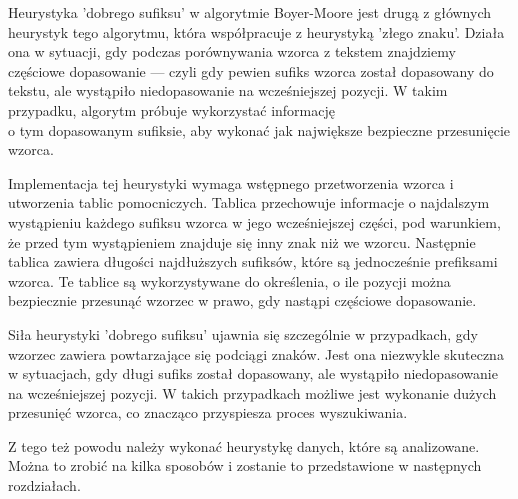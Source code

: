 Heurystyka 'dobrego sufiksu' w algorytmie Boyer-Moore 
jest drugą z głównych heurystyk tego algorytmu, która współpracuje z heurystyką 
'złego znaku'. Działa ona w sytuacji, gdy podczas porównywania wzorca z tekstem
znajdziemy częściowe dopasowanie — czyli gdy pewien sufiks wzorca został 
dopasowany do tekstu, ale wystąpiło niedopasowanie na wcześniejszej pozycji. 
W takim przypadku, algorytm próbuje wykorzystać informację \\ o tym dopasowanym 
sufiksie, aby wykonać jak największe bezpieczne przesunięcie wzorca.

Implementacja tej heurystyki wymaga wstępnego przetworzenia wzorca i utworzenia 
tablic pomocniczych. Tablica przechowuje informacje o najdalszym 
wystąpieniu każdego sufiksu wzorca w jego wcześniejszej części, pod warunkiem, 
że przed tym wystąpieniem znajduje się inny znak niż we wzorcu. Następnie tablica 
zawiera długości najdłuższych sufiksów, które są jednocześnie prefiksami wzorca.
Te tablice są wykorzystywane do określenia, o ile pozycji można bezpiecznie 
przesunąć wzorzec w prawo, gdy nastąpi częściowe dopasowanie.

Siła heurystyki 'dobrego sufiksu' ujawnia się szczególnie w przypadkach, gdy 
wzorzec zawiera powtarzające się podciągi znaków. Jest ona niezwykle skuteczna
w sytuacjach, gdy długi sufiks został dopasowany, ale wystąpiło niedopasowanie
na wcześniejszej pozycji. W takich przypadkach możliwe jest wykonanie dużych 
przesunięć wzorca, co znacząco przyspiesza proces wyszukiwania. 

Z tego też powodu należy wykonać heurystykę danych, które są analizowane.
Można to zrobić na kilka sposobów i zostanie to przedstawione w następnych rozdziałach.

